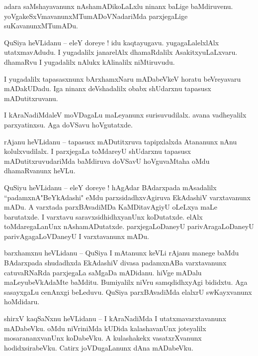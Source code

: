 \documentclass{article}
\begin{document}
\begin{mn}%
adara saMshayavanunx nAshamADikoLaLxlu ninanx baLige baMdiruvenu. 
yoVgakeSxVmavanunxMTumADoVNadariMda parxjegaLige suKavanunxMTumADu.
\end{mn}

\begin{mn}%
QuSiya heVLidanu -- eleY doreye ! idu kaqtayugavu. yugagaLalelxlAlx utatxmavAdudu. I yugadalilx 
janarelAlx dhamaRdalilx AsakitxyuLaLxvaru. dhamaRvu I yugadalilx nAlukx kAlinalilx niMtiruvudu.
\end{mn}

\begin{mn}%
I yugadalilx tapasasxnunx bArxhamxNaru mADabeVkeV horatu beVreyavaru mADakUDadu. Iga ninanx 
deVshadalilx obabx shUdarxnu tapasusx mADutitxruvanu.
\end{mn}

\begin{mn}%
I kAraNadiMdaleV moVDagaLu maLeyanunx surisuvudilalx. avana vadheyalilx parxyatinxsu. Aga doVSavu 
hoVgutatxde.
\end{mn}

\begin{mn}%
rAjanu heVLidanu -- tapasusx mADutitxruva tapipxlalxda Atananunx nAnu kolulxvudilalx. I parxjegaLa 
toMdareyU shUdarxnu tapasusx mADutitxruvudariMda baMdiruva doVSavU hoVguvaMtaha oMdu dhamaRvanunx 
heVLu.
\end{mn}

\begin{mn}%
QuSiyu heVLidanu -- eleY doreye ! hAgAdar BAdarxpada mAsadalilx ``padamxnA"BeYkAdashi" eMdu 
parxsidadhxvAgiruva EkAdashiV varxtavanunx mADu. A varxtada parxBAvadiMDa KaMDitavAgiyU oLeLxya 
maLe barutatxde. I varxtavu saravxsidhidhxyanUnx koDutatxde. elAlx toMdaregaLanUnx 
nAshamADutatxde. parxjegaLoDaneyU parivAragaLoDaneyU parivAgagaLoVDaneyU I varxtavanunx mADu.
\end{mn}

\begin{mn}%
barxhamxnu heVLidanu -- QuSiya I mAtanunx keVLi rAjanu manege baMdu BAdarxpada shudadhxda EkAdashiV 
divasa padamxnABa varxtavanunx catuvaRNaRda parxjegaLa saMgaDa mADidanu. hiVge mADalu 
maLeyubeVkAdaMte baMditu. Bumiyalilx niVru samqdidhxyAgi bididxtu. Aga sasayxgaLu cenAnxgi 
beLeduvu. QuSiya parxBAvadiMda elalxrU swKayxvanunx hoMdidaru.
\end{mn}

\begin{mn}%
shirxV kaqSaNxnu heVLidanu -- I kAraNadiMda I utatxmavarxtavanunx mADabeVku. oMdu niVriniMda kUDida 
kalashavanUnx joteyalilx mosarananxvanUnx koDabeVku. A kulashakekx vasatxrXvanunx hodidxsirabeVku. 
Catirx joVDugaLanunx dAna mADabeVku.
\end{mn}
\end{document}
